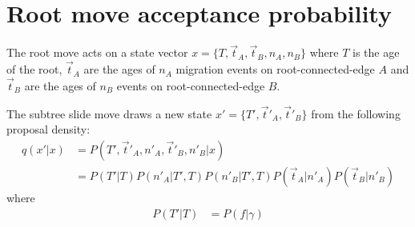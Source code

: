 \documentclass[a4paper, 11pt]{article}
\begin{document}
\section{Root move acceptance probability}

The root move acts on a state vector $x=\{T,\vec{t}_A,\vec{t}_B,n_A,n_B\}$
where $T$ is the age of the root, $\vec{t}_A$ are the ages of
$n_A$ migration events on root-connected-edge $A$ and $\vec{t}_B$ are the
ages of $n_B$ events on root-connected-edge $B$.

The subtree slide move draws a new state $x'=\{T',\vec{t}'_A,\vec{t}'_B\}$
from the following proposal density:
\begin{align}
  q(x'|x) &= P(T',\vec{t}'_A,n'_A,\vec{t}'_B,n'_B|x) \nonumber \\
& = P(T'|T)P(n'_A|T',T)P(n'_B|T',T)P(\vec{t}_A|n'_A)P(\vec{t}_B|n'_B)
\end{align}
where
\begin{align}
  P(T'|T) &= P(f|\gamma)
\end{align}
\end{document}
